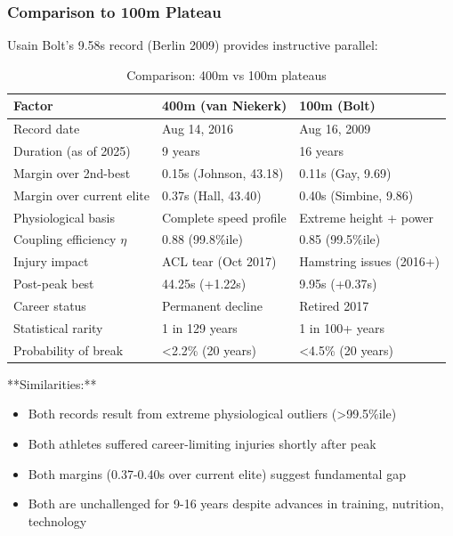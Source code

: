 \subsubsection{Comparison to 100m Plateau}

Usain Bolt's 9.58s record (Berlin 2009) provides instructive parallel:

\begin{table}[H]
\centering
\caption{Comparison: 400m vs 100m plateaus}
\begin{tabular}{@{}lll@{}}
\toprule
\textbf{Factor} & \textbf{400m (van Niekerk)} & \textbf{100m (Bolt)} \\
\midrule
Record date & Aug 14, 2016 & Aug 16, 2009 \\
Duration (as of 2025) & 9 years & 16 years \\
Margin over 2nd-best & 0.15s (Johnson, 43.18) & 0.11s (Gay, 9.69) \\
Margin over current elite & 0.37s (Hall, 43.40) & 0.40s (Simbine, 9.86) \\
\midrule
Physiological basis & Complete speed profile & Extreme height + power \\
Coupling efficiency $\eta$ & 0.88 (99.8\%ile) & 0.85 (99.5\%ile) \\
\midrule
Injury impact & ACL tear (Oct 2017) & Hamstring issues (2016+) \\
Post-peak best & 44.25s (+1.22s) & 9.95s (+0.37s) \\
Career status & Permanent decline & Retired 2017 \\
\midrule
Statistical rarity & 1 in 129 years & 1 in 100+ years \\
Probability of break & <2.2\% (20 years) & <4.5\% (20 years) \\
\bottomrule
\end{tabular}
\end{table}

**Similarities:**
\begin{itemize}
    \item Both records result from extreme physiological outliers (>99.5\%ile)
    \item Both athletes suffered career-limiting injuries shortly after peak
    \item Both margins (0.37-0.40s over current elite) suggest fundamental gap
    \item Both are unchallenged for 9-16 years despite advances in training, nutrition, technology
\end{itemize}

